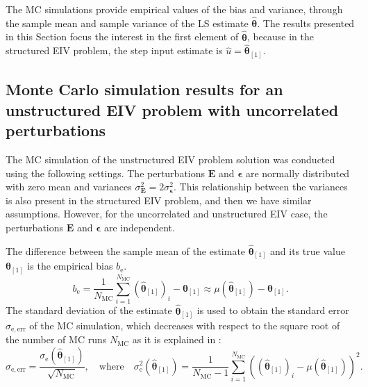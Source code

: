 The MC simulations provide empirical values of the bias and variance, through the sample mean and sample variance of the LS estimate $\widehat{\bm{\theta}}$.
The results presented in this Section focus the interest in the first element of $\widehat{\bm{\theta}}$, because in the structured EIV problem, the step input estimate is $\widehat{u} = \widehat{\bm{\theta}}_{\left[1\right]}$.

\subsection{Monte Carlo simulation results for an unstructured EIV problem with uncorrelated perturbations}

The MC simulation of the unstructured EIV problem solution was conducted using the following settings.
The perturbations $\mathbf{E}$ and $\bm{\epsilon}$ are normally distributed with zero mean and variances $\sigma_{\mathbf{E}}^2 = 2 \sigma_{\bm{\epsilon}}^2$.
\color{blue} 
This relationship between the variances is also present in the structured EIV problem, and then we have similar assumptions.
However, for the uncorrelated and unstructured EIV case, the perturbations $\mathbf{E}$ and $\bm{\epsilon}$ are independent.\color{black}



The difference between the sample mean of the estimate $\widehat{\bm{\theta}}_{\left[1\right]}$ and its true value $\bm{\theta}_{\left[1\right]}$ is the empirical bias $b_\mathrm{e}$.
\begin{equation} {b}_\mathrm{e} = \frac{1}{N_{\mathrm{MC}}} \sum_{i=1}^{N_{\mathrm{MC}}}{ \left( \widehat{\bm{\theta}}_{\left[1\right]} \right)_i -  \bm{\theta}_{\left[1\right]} } \approx \mu \left( \widehat{\bm{\theta}}_{\left[1\right]} \right) - \bm{\theta}_{\left[1\right]} . \end{equation}
The standard deviation of the estimate $\widehat{\bm{\theta}}_{\left[1\right]}$ is used to obtain the standard error $\sigma_\mathrm{e,err}$ of the MC simulation, which decreases with respect to the square root of the number of MC runs $N_{\mathrm{MC}}$ as it is explained in \citet{Hammersley75}: 
\begin{equation} \sigma_\mathrm{e,err} = \frac{ \sigma_\mathrm{e} \left( \widehat{\bm{\theta}}_{\left[1\right]} \right) }{\sqrt{N_{\mathrm{MC}}}}, \quad \mathrm{where} \quad \sigma_\mathrm{e}^2 \left( \widehat{\bm{\theta}}_{\left[1\right]} \right) = \frac{1}{N_{\mathrm{MC}}-1} \sum_{i=1}^{N_{\mathrm{MC}}}{ \left( \left( \widehat{\bm{\theta}}_{\left[1\right]} \right)_i - \mu \left( \widehat{\bm{\theta}}_{\left[1\right]} \right) \right)^2 } . \label{eqn:stderr} \end{equation}

